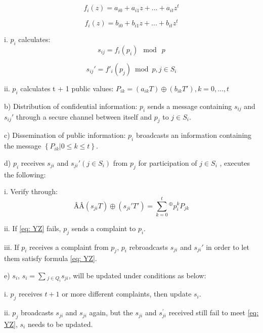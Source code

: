 \documentclass[a4paper,12pt]{article}
\begin{document}
\begin{equation}
  \label{eq: TA}
  f_i (z) = a_{i0} + a_{i1} z + ... + a_{it} z^t
\end{equation}

\begin{equation}
  \label{eq: TA}
  f_i (z) = b_{i0} + b_{i1} z + ... + b_{it} z^t
\end{equation}

i. $p_i$ calculates:
\begin{equation}
  \label{eq: TA}
 s_{ij} = f_i(p_i)\ \bmod \ p
\end{equation}

\begin{equation}
  \label{eq: TA}
 {s_{ij}}'= f{'_i} \left({{p_j}} \right) \bmod p, j \in{S_i}%
\end{equation}

ii. $p_i$ calculates t + 1 public values: ${P_{ik}} = \left({{a_{ik}} T} \right) \oplus \left({{b_{ik}} T' } \right), k = 0, ..., t$

b) Distribution of confidential information: $p_i$ sends a message containing $s_{ij}$ and ${s_{ij}}'$ through a secure channel between itself and  $p_j$ to $j \in S_i$.

c) Dissemination of public information: $p_i$ broadcasts an information containing the message $\left \{{{P_{ik}}|0 \le k \le t} \right \}$.

d) $ p_i$ receives $s_{ji}$ and ${s_{ji}}'\left(j \in S_i \right)$ from  $ p_j$ for participation of $ j \in S_i$ , executes the following:

i. Verify through:
\begin{equation}
Â Â \label{eq: YZ}
\left({{s_{ji}} T} \right) \oplus \left({{s_{ji}}'T'} \right) = \sum \limits_{k = 0}^t{}^\oplus p_i^k{P_{jk}}
\end{equation}

ii. If \ref{eq: YZ} fails, $p_j$ sends a complaint to $p_i$.

iii. If $p_i$ receives a complaint from $p_j$, $ p_i$ rebroadcasts $s_{ji}$ and ${s_{ji}}'$ in order to let them satisfy formula \ref{eq: YZ}.

e) $s_i$,  ${s_i} = \sum \limits _{} ^{}{_{j \in{Q_i} }{s_{ji}}}$, will be updated under conditions as below:

i. $p_j$ receives $t + 1$ or more different complaints, then update $s_i$.

ii. $p_j$ broadcasts $ s_{ji}$ and ${s_{ji}}$ again, but the $ s_{ji}$ and $s_{ji}^{'}$ received still fail to meet \ref{eq: YZ}, $s_i$ needs to be updated.
\end{document}
